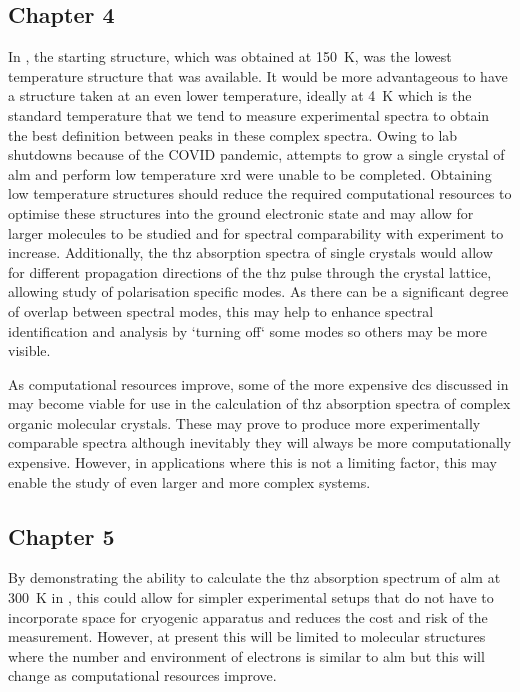 \subsection{Chapter 4}
In , the starting structure, which was obtained at \SI{150}{K}, was the lowest temperature structure that was available. It would be more advantageous to have a structure taken at an even lower temperature, ideally at \SI{4}{K} which is the standard temperature that we tend to measure experimental spectra to obtain the best definition between peaks in these complex spectra. Owing to lab shutdowns because of the COVID pandemic, attempts to grow a single crystal of \acrshort{alm} and perform low temperature \acrshort{xrd} were unable to be completed. Obtaining low temperature structures should reduce the required computational resources to optimise these structures into the ground electronic state and may allow for larger molecules to be studied and for spectral comparability with experiment to increase. Additionally, the \acrshort{thz} absorption spectra of single crystals would allow for different propagation directions of the \acrshort{thz} pulse through the crystal lattice, allowing study of polarisation specific modes. As there can be a significant degree of overlap between spectral modes, this may help to enhance spectral identification and analysis by `turning off` some modes so others may be more visible. 

As computational resources improve, some of the more expensive \acrshort{dc}s discussed in  may become viable for use in the calculation of \acrshort{thz} absorption spectra of complex organic molecular crystals. These may prove to produce more experimentally comparable spectra although inevitably they will always be more computationally expensive. However, in applications where this is not a limiting factor, this may enable the study of even larger and more complex systems.

\subsection{Chapter 5}
By demonstrating the ability to calculate the \acrshort{thz} absorption spectrum of \acrshort{alm} at \SI{300}{K} in , this could allow for simpler experimental setups that do not have to incorporate space for cryogenic apparatus and reduces the cost and risk of the measurement. However, at present this will be limited to molecular structures where the number and environment of electrons is similar to \acrshort{alm} but this will change as computational resources improve.

